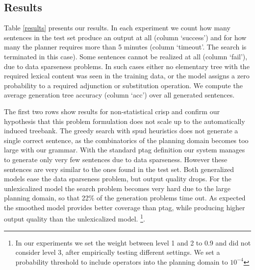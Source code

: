 \subsection{Results}
Table \ref{results} presents our results. In each experiment we count how many sentences in the test set produce an output at all (column `success') and for how many the planner requires more than 5 minutes (column `timeout'. The search is terminated in this case). Some sentences cannot be realized at all (column `fail'), due to data sparseness problems. In such cases either no elementary tree with the required lexical content was seen in the training data, or the model assigns a zero probability to a required adjunction or substitution operation. We compute the average generation tree accuracy (column `acc') over all generated sentences.
 
The first two rows show results for non-statistical {\sc crisp} and confirm our hypothesis that this problem formulation does not scale up to the automatically induced treebank. The greedy search with {\sc spud} heuristics does not generate a single correct sentence, as the combinatorics of the planning domain becomes too large with our grammar. 
With the standard {\sc ptag} definition our system manages to generate only very few sentences due to data sparseness. However these sentences are very similar to the ones found in the test set. Both generalized models ease the data sparseness problem, but output quality drops. For the unlexicalized model the search problem becomes very hard due to the large planning domain, so that 22\% of the generation problems time out. As expected the smoothed model provides better coverage than {\sc ptag}, while producing higher output quality than the unlexicalized model. 
\footnote{In our experiments we set the weight between level 1 and 2 to 0.9 and did not consider level 3, after empirically testing different settings. We set a probability threshold to include operators into the planning domain to $10^{-4}$}.

